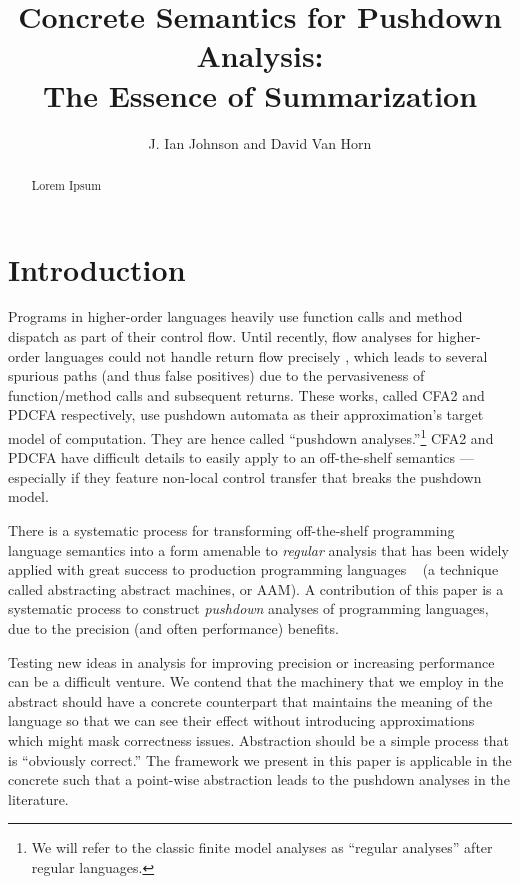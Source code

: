 \documentclass{llncs}
\title{Concrete Semantics for Pushdown Analysis:\\The Essence of Summarization}
\author{J. Ian Johnson and David Van Horn}
\institute{Northeastern University \\
           \email{\{ianj,dvanhorn\}@ccs.neu.edu}}
\begin{document}
\maketitle


\begin{abstract}
  Lorem Ipsum
\end{abstract}

\section{Introduction}

Programs in higher-order languages heavily use function calls and
method dispatch as part of their control flow. Until recently, flow
analyses for higher-order languages could not handle return flow
precisely \citep{ianjohnson:vardoulakis-lmcs11,
  ianjohnson:earl2010pdcfa}, which leads to several spurious paths
(and thus false positives) due to the pervasiveness of function/method
calls and subsequent returns. These works, called CFA2 and PDCFA
respectively, use pushdown automata as their approximation's target
model of computation. They are hence called ``pushdown
analyses.''\footnote{We will refer to the classic finite model
  analyses as ``regular analyses'' after regular languages.} CFA2 and
PDCFA have difficult details to easily apply to an off-the-shelf
semantics --- especially if they feature non-local control transfer
that breaks the pushdown model.

There is a systematic process for transforming off-the-shelf
programming language semantics into a form amenable to \emph{regular}
analysis that has been widely applied with great success to production
programming languages ~\citet{dvanhorn:VanHorn2010Abstracting} (a
technique called abstracting abstract machines, or AAM). A
contribution of this paper is a systematic process to construct
\emph{pushdown} analyses of programming languages, due to the
precision (and often performance) benefits.

Testing new ideas in analysis for improving precision or increasing
performance can be a difficult venture. We contend that the machinery
that we employ in the abstract should have a concrete counterpart that
maintains the meaning of the language so that we can see their effect
without introducing approximations which might mask correctness
issues. Abstraction should be a simple process that is ``obviously
correct.'' The framework we present in this paper is applicable in the
concrete such that a point-wise abstraction leads to the pushdown
analyses in the literature.
\end{document}

